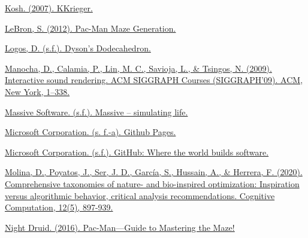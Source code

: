 \begin{thebibliography}{1}
	
	\href{https://www.scenebeta.com/noticia/kkrieger}{Kosh. (2007). KKrieger.}
	
	
	
    \href{https://shaunlebron.github.io/pacman-mazegen/}{LeBron, S. (2012). Pac-Man Maze Generation.}
	
	
	\href{http://dysonlogos.blog/}{Logos, D. (s.f.). Dyson’s Dodecahedron.}
	
	
	
	\href{https://doi.org/10.1145/1667239.1667254}{Manocha, D., Calamia, P., Lin, M. C., Savioja, L., \& Tsingos, N. (2009). Interactive sound rendering. ACM SIGGRAPH Courses (SIGGRAPH’09). ACM, New York, 1–338.}
	
	
	\href{http://massivesoftware.com/}{Massive Software. (s.f.). Massive – simulating life.}
	
	
	\href{https://pages.github.com/}{Microsoft Corporation. (s. f.-a). Github Pages.}
	
	
	\href{https://github.com/}{Microsoft Corporation. (s.f.). GitHub: Where the world builds software.}
	
	
	\href{https://doi.org/10.1109/TCIAIG.2011.2148116}{Molina, D., Poyatos, J., Ser, J. D., García, S., Hussain, A., \& Herrera, F. (2020). Comprehensive taxonomies of nature- and bio-inspired optimization: Inspiration versus algorithmic behavior, critical analysis recommendations. Cognitive Computation, 12(5), 897-939.}
	
	
	
	\href{https://steamcommunity.com/sharedfiles/filedetails/?id=593226813}{Night Druid. (2016). Pac-Man—Guide to Mastering the Maze!}
	
	
	

\end{thebibliography}
